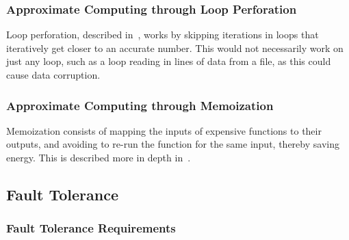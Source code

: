 \subsubsection{Approximate Computing through Loop Perforation}

Loop perforation, described in~\citet{li2018sculptor}, works by skipping iterations in loops that iteratively get closer to an accurate number. This would not necessarily work on just any loop, such as a loop reading in lines of data from a file, as this could cause data corruption.

\subsubsection{Approximate Computing through Memoization}

Memoization consists of mapping the inputs of expensive functions to their outputs, and avoiding to re-run the function for the same input, thereby saving energy. This is described more in depth in~\citep{mittal2016survey}.

\subsection{Fault Tolerance}

\subsubsection{Fault Tolerance Requirements}
